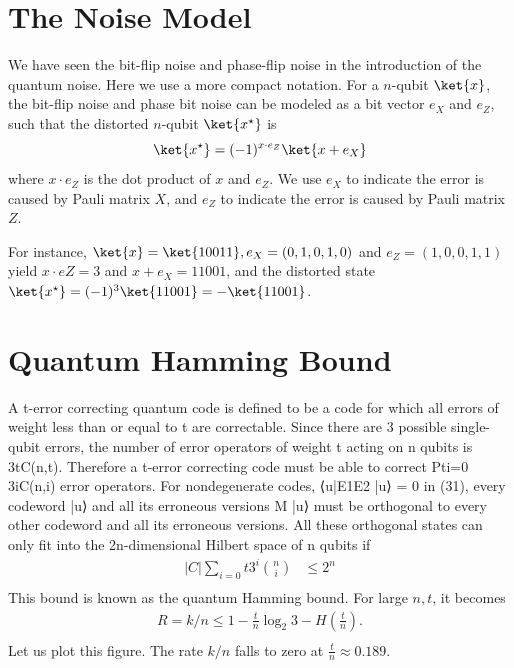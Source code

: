 \section{The Noise Model}
We have seen the bit-flip noise and phase-flip noise in the introduction of the quantum noise. Here we use a more compact notation. For a \(n\)-qubit \(\ket{x}\), the bit-flip noise and phase bit noise can be modeled as a bit vector \(e_X\) and \(e_Z\), such that the distorted \(n\)-qubit \(\ket{x^{\star}}\) is 
\begin{equation}
    \ket{x^{\star}} = (-1)^{x\cdot e_Z} \ket{x+e_X} \label{eq:QEC_noise}
\end{equation}
where \(x \cdot e_Z\) is the dot product of \(x\) and \(e_Z\). We use \(e_X\) to indicate the error is caused by Pauli matrix \(X\), and \(e_Z\) to indicate the error is caused by Pauli matrix \(Z\). 

For instance, \(\ket{x} = \ket{10011}, e_X = (0, 1, 0, 1, 0) \) and \(e_Z = (1, 0, 0, 1, 1)\) yield \(x \cdot eZ = 3\)  and \(x+e_X = 11001\), and the distorted state \(\ket{x^{\star}} = (-1)^3 \ket{11001} = - \ket{11001}\).

\section{Quantum Hamming Bound}
A t-error correcting quantum code is defined to be a code for which all errors of weight less than or equal to t are correctable. Since there are 3 possible single-qubit errors, the number of error operators of weight t acting on n qubits is 3tC(n,t). Therefore a t-error correcting code must be able to correct Pti=0 3iC(n,i) error operators. For nondegenerate codes, ⟨u|E1E2 |u⟩ = 0 in (31), every codeword |u⟩ and all its erroneous versions M |u⟩ must be orthogonal to every other codeword and all its erroneous versions. All these orthogonal states can only fit into the 2n-dimensional Hilbert space of n qubits if
\begin{align*}
    |C| \sum_{i=0}{t} 3^i \binom{n}{i} &\leq 2^n \\
\end{align*}
This bound is known as the quantum Hamming bound. For large \(n, t\), it becomes 
\begin{align*}
    R = k/n \leq 1 - \frac{t}{n} \log_2 3 - H(\frac{t}{n}).\\
\end{align*}
Let us plot this figure. The rate \(k/n\) falls to zero at \(\frac{t}{n} \approx 0.189\). 

